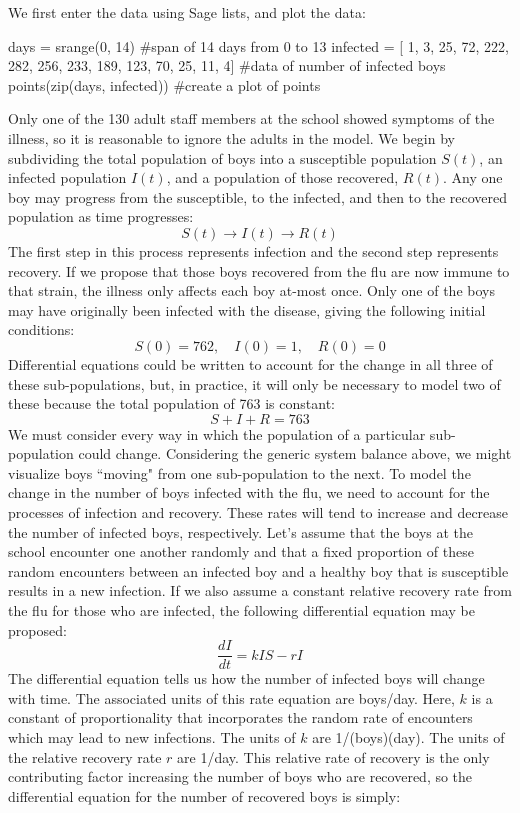 \documentclass{ximera}
\begin{document}
We first enter the data using Sage lists, and plot the data:
 
\begin{sageCell}
days = srange(0, 14) #span of 14 days from 0 to 13
infected = [  1,   3,  25, 72, 222, 282, 256,
            233, 189, 123, 70,  25,  11,   4] #data of number of infected boys
points(zip(days, infected)) #create a plot of points
\end{sageCell}

Only one of the 130 adult staff members at the school showed symptoms of the illness, so it is reasonable to ignore the adults in the model.  We begin by subdividing the total population of boys into a susceptible population $S(t)$, an infected population $I(t)$, and a population of those recovered, $R(t)$.  Any one boy may progress from the susceptible, to the infected, and then to the recovered population as time progresses:
$$S(t)\longrightarrow I(t)\longrightarrow R(t)$$
The first step in this process represents infection and the second step represents recovery.  If we propose that those boys recovered from the flu are now immune to that strain, the illness only affects each boy at-most once.  Only one of the boys may have originally been infected with the disease, giving the following initial conditions:
$$S(0)=762,\quad I(0)=1,\quad R(0)=0$$
Differential equations could be written to account for the change in all three of these sub-populations, but, in practice, it will only be necessary to model two of these because the total population of 763 is constant:
$$S+I+R=763$$
We must consider every way in which the population of a particular sub-population could change.  Considering the generic system balance above, we might visualize boys ``moving" from one sub-population to the next.  To model the change in the number of boys infected with the flu, we need to account for the processes of infection and recovery.  These rates will tend to increase and decrease the number of infected boys, respectively.  Let's assume that the boys at the school encounter one another randomly and that a fixed proportion of these random encounters between an infected boy and a healthy boy that is susceptible results in a new infection.  If we also assume a constant relative recovery rate from the flu for those who are infected, the following differential equation may be proposed:
$$\frac{dI}{dt}=kIS-rI $$
The differential equation tells us how the number of infected boys will change with time.  The associated units of this rate equation are boys/day.  Here, $k$ is a constant of proportionality that incorporates the random rate of encounters which may lead to new infections.  The units of $k$ are 1/(boys)(day).  The units of the relative recovery rate $r$ are 1/day.  This relative rate of recovery is the only contributing factor increasing the number of boys who are recovered, so the differential equation for the number of recovered boys is simply:
\end{document}
